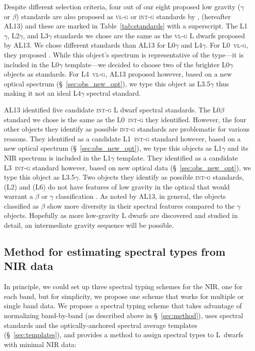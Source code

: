 \documentclass[12pt]{aastex6}
\begin{document}
Despite different selection criteria, four out of our eight proposed low gravity ($\gamma$ or $\beta$) standards are also proposed as \textsc{vl-g} or \textsc{int-g} standards by \citet{Allers:2013hk}, (hereafter AL13) and these are marked in Table~\ref{tab:standards} with a superscript.
The L1$\gamma$, L2$\gamma$, and L3$\gamma$ standards we chose are the same as the \textsc{vl-g} L dwarfs proposed by AL13.
We chose different standards than AL13 for L0$\gamma$ and L4$\gamma$.
For L0~\textsc{vl-g}, they proposed . While this object's spectrum is representative of the type---it is included in the L0$\gamma$ template---we decided to choose two of the brighter L0$\gamma$ objects as standards.
For L4~\textsc{vl-g}, AL13 proposed  however, based on a new optical spectrum (\S~\ref{sec:obs_new_opt}), we type this object as L3.5$\gamma$ thus making it not an ideal L4$\gamma$ spectral standard.

AL13 identified five candidate \textsc{int-g} L dwarf spectral standards.
The L0$\beta$ standard we chose is the same as the L0~\textsc{int-g} they identified.
However, the four other objects they identify as possible \textsc{int-g} standards are problematic for various reasons.
They identified  as a candidate L1~\textsc{int-g} standard however, based on a new optical spectrum (\S~\ref{sec:obs_new_opt}), we type this objects as L1$\gamma$ and its NIR spectrum is included in the L1$\gamma$ template.
They identified  as a candidate L3~\textsc{int-g} standard however, based on new optical data (\S~\ref{sec:obs_new_opt}), we type this object as L3.5$\gamma$.
Two objects they identify as possible \textsc{int-g} standards,  (L2) and  (L6) do not have features of low gravity in the optical that would warrant a $\beta$ or $\gamma$ classification \citep{Cruz07,K00}.
As noted by AL13, in general, the objects classified as $\beta$ show more diversity in their spectral features compared to the $\gamma$ objects. Hopefully as more low-gravity L dwarfs are discovered and studied in detail, an intermediate gravity sequence will be possible.



\subsection{Method for estimating spectral types from NIR data}

In principle, we could set up three spectral typing schemes for the NIR, one for each band, but for simplicity, we propose one scheme that works for multiple or single band data.
We propose a spectral typing scheme that takes advantage of normalizing band-by-band (as described above in \S~\ref{sec:method}), uses spectral standards and the optically-anchored spectral average templates (\S~\ref{sec:templates}), and provides a method to assign spectral types to L~dwarfs with minimal NIR data:
\end{document}
